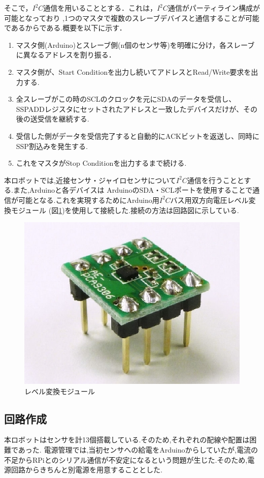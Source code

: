 \documentclass[11pt,a4]{jsarticle}
\begin{document}
そこで，$I^2 C$通信を用いることとする．これは，$I^2 C$通信がパーティライン構成が可能となっており
,1つのマスタで複数のスレーブデバイスと通信することが可能であるからである.概要を以下に示す．
\begin{enumerate}
 \item マスタ側(Arduino)とスレーブ側(n個のセンサ等)を明確に分け，各スレーブに異なるアドレスを割り振る．
 \item マスタ側が、Start Conditionを出力し続いてアドレスとRead/Write要求を出力する.
 \item 全スレーブがこの時のSCLのクロックを元にSDAのデータを受信し、SSPADDレジスタにセットされたアドレスと一致したデバイスだけが、その後の送受信を継続する.
 \item 受信した側がデータを受信完了すると自動的にACKビットを返送し、同時にSSP割込みを発生する.
 \item これをマスタがStop Conditionを出力するまで続ける.
\end{enumerate}

本ロボットでは,近接センサ・ジャイロセンサについて$I^2 C$通信を行うこととする.また,Arduinoと各デバイスは
ArduinoのSDA・SCLポートを使用することで通信が可能となる.これを実現するためにArduino用$I^2 C$バス用双方向電圧レベル変換モジュール
(図\ref{level})を使用して接続した.接続の方法は回路図に示している.

\begin{figure}[h]
 \centering
 \includegraphics[width=0.4\hsize]{./picture/kakeru/level.eps}
    \caption{レベル変換モジュール}
    \label{level}
\end{figure}
\newpage
\subsection{回路作成}
本ロボットはセンサを計13個搭載している.そのため,それぞれの配線や配置は困難であった.
電源管理では,当初センサへの給電をArduinoからしていたが,電流の不足からRPiとのシリアル通信が不安定になるという問題が生じた.そのため,電源回路からきちんと別電源を用意することとした.
\end{document}
